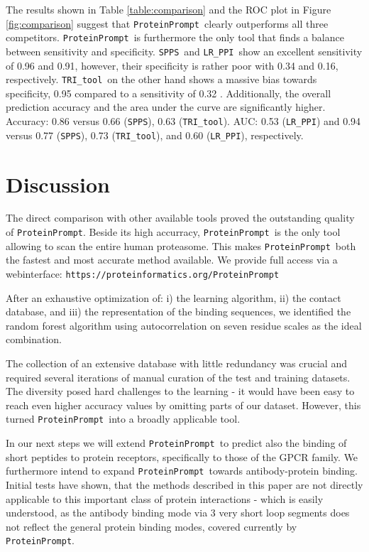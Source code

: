 \documentclass[3p,times,twocolumn]{elsarticle}
\newcommand{\url}[1]{\texttt{https://\small #1}}
\newcommand{\spps}{\texttt{SPPS}}
\newcommand{\tri}{\texttt{TRI\_tool}}
\newcommand{\lr}{\texttt{LR\_PPI}}
\newcommand{\tool}{\texttt{ProteinPrompt}}
\newcommand{\website}{\url{proteinformatics.org/\tool}}
\begin{document}
The results shown in Table \ref{table:comparison} and the ROC plot in
Figure \ref{fig:comparison} suggest that \tool\  clearly outperforms all
three competitors. \tool\  is furthermore the only tool that finds a
balance between sensitivity and specificity. \spps\ and \lr\ show an
excellent sensitivity of 0.96 and 0.91, however, their
specificity is rather poor with 0.34 and 0.16, respectively. \tri\ on
the other hand shows a massive bias towards specificity, 0.95 compared
to a sensitivity of 0.32 .
Additionally, the overall prediction accuracy and the area under the curve are significantly higher.
Accuracy: 0.86 versus 0.66 (\spps), 0.63 (\tri).
AUC: 0.53 (\lr) and 0.94 versus 0.77 (\spps), 0.73 (\tri), and 0.60 (\lr), respectively.


\section{Discussion}

The direct comparison with other available tools proved the
outstanding quality of \tool. Beside its high accurracy, \tool\  is the
only tool allowing to scan the entire human proteasome. This makes
\tool\  both the fastest and most accurate method available. We provide
full access via a webinterface: \website

After an exhaustive optimization of: i) the learning algorithm, ii)
the contact database, and iii) the representation of the binding
sequences, we identified the random forest algorithm using autocorrelation on seven
residue scales as the ideal combination.

The collection of an extensive database with little redundancy was crucial
and required several iterations of manual curation of the test and training datasets.
The diversity posed hard challenges to the learning
- it would have been easy to reach even higher accuracy values by omitting parts of our dataset.
However, this turned \tool\ into a broadly applicable tool.

In our next steps we will extend \tool\  to predict also the binding of short peptides to protein receptors, specifically to those of the GPCR family.
We furthermore intend to expand \tool\  towards antibody-protein binding.
Initial tests have shown, that the methods described in this paper are not directly applicable to this important class of protein interactions - which is easily understood, as the antibody binding mode via 3 very short loop segments does not reflect the general protein binding modes, covered currently by \tool. 
\end{document}
